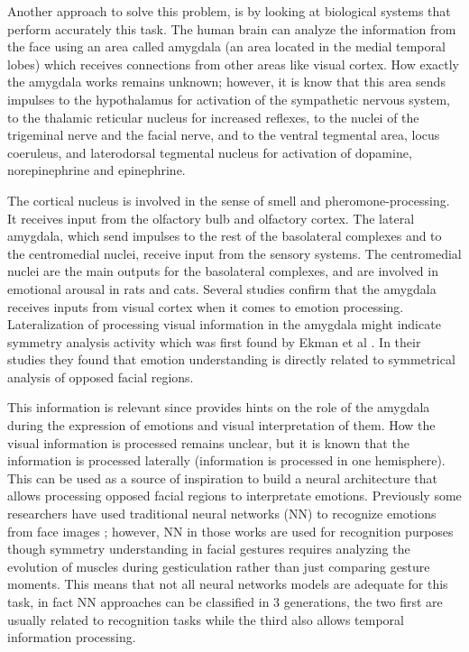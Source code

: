 Another approach to solve this problem, is by looking at biological systems that perform accurately this task. The human brain can analyze the information from the face using an area called amygdala \cite{Sergerie2008} (an area located in the medial temporal lobes) which receives connections from other areas like visual cortex. How exactly the amygdala works remains unknown; however, it is know that this area sends impulses to the hypothalamus for activation of the sympathetic nervous system, to the thalamic reticular nucleus for increased reflexes, to the nuclei of the trigeminal nerve and the facial nerve, and to the ventral tegmental area, locus coeruleus, and laterodorsal tegmental nucleus for activation of dopamine, norepinephrine and epinephrine.%

The cortical nucleus is involved in the sense of smell and pheromone-processing. It receives input from the olfactory bulb and olfactory cortex. The lateral amygdala, which send impulses to the rest of the basolateral complexes and to the centromedial nuclei, receive input from the sensory systems. The centromedial nuclei are the main outputs for the basolateral complexes, and are involved in emotional arousal in rats and cats. Several studies confirm that the amygdala receives inputs from visual cortex when it comes to emotion processing. Lateralization of processing visual information in the amygdala might indicate symmetry analysis activity which was first found by Ekman et al \cite{Hager1979}. In their studies they found that emotion understanding is directly related to symmetrical analysis of opposed facial regions.

This information is relevant since provides hints on the role of the amygdala during the expression of emotions and visual interpretation of them. How the visual information is processed remains unclear, but it is known that the information is processed laterally (information is processed in one hemisphere). This can be used as a source of inspiration to build a neural architecture that allows processing opposed facial regions to interpretate emotions. Previously some researchers have used traditional neural networks (NN) to recognize emotions from face images\cite{Spiros2005}%
; however, NN in those works are used for recognition purposes though symmetry understanding in facial gestures requires analyzing the evolution of muscles during gesticulation rather than just comparing gesture moments. This means that not all neural networks models are adequate for this task, in fact NN approaches can be classified in 3 generations, the two first are usually related to recognition tasks while the third also allows temporal information processing.


